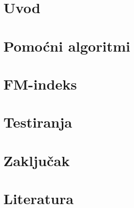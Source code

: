 \documentclass[pdftex,12pt,a4paper]{report}
\begin{document}


\tableofcontents

\chapter{Uvod}


\chapter{Pomoćni algoritmi}


\chapter{FM-indeks}


\chapter{Testiranja}


\chapter{Zaključak}


\chapter{Literatura}

%

% 
\end{document}

